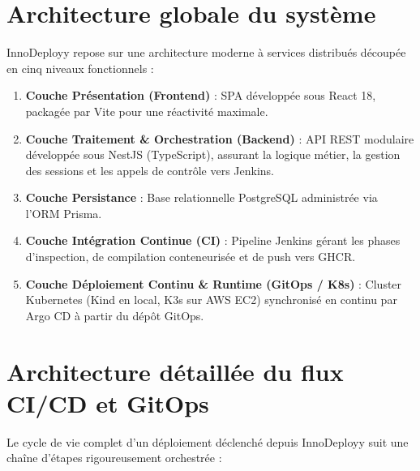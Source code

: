 \documentclass[12pt,a4paper,oneside]{report}
\begin{document}
\section{Architecture globale du système}
InnoDeployy repose sur une architecture moderne à services distribués découpée en cinq niveaux fonctionnels :
\begin{enumerate}
    \item \textbf{Couche Présentation (Frontend)} : SPA développée sous React 18, packagée par Vite pour une réactivité maximale.
    \item \textbf{Couche Traitement \& Orchestration (Backend)} : API REST modulaire développée sous NestJS (TypeScript), assurant la logique métier, la gestion des sessions et les appels de contrôle vers Jenkins.
    \item \textbf{Couche Persistance} : Base relationnelle PostgreSQL administrée via l'ORM Prisma.
    \item \textbf{Couche Intégration Continue (CI)} : Pipeline Jenkins gérant les phases d'inspection, de compilation conteneurisée et de push vers GHCR.
    \item \textbf{Couche Déploiement Continu \& Runtime (GitOps / K8s)} : Cluster Kubernetes (Kind en local, K3s sur AWS EC2) synchronisé en continu par Argo CD à partir du dépôt GitOps.
\end{enumerate}

\section{Architecture détaillée du flux CI/CD et GitOps}
Le cycle de vie complet d'un déploiement déclenché depuis InnoDeployy suit une chaîne d'étapes rigoureusement orchestrée :
\end{document}
